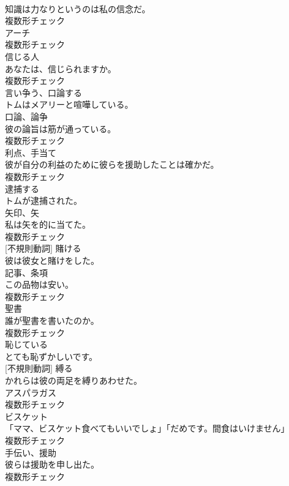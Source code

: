 \documentclass[8pt]{extreport}
\begin{document}
\begin{CJK}{UTF8}{min}
\\	知識は力なりというのは私の信念だ。	
\\	複数形チェック
\\	[名詞]	アーチ	
\\	複数形チェック
\\	[名詞]	信じる人	
\\	あなたは、信じられますか。	
\\	複数形チェック
\\	[動詞]	言い争う、口論する	
\\	トムはメアリーと喧嘩している。	
\\	[名詞]	口論、論争	
\\	彼の論旨は筋が通っている。	
\\	複数形チェック
\\	[名詞]	利点、手当て	
\\	彼が自分の利益のために彼らを援助したことは確かだ。	
\\	複数形チェック
\\	[動詞]	逮捕する	
\\	トムが逮捕された。	
\\	[名詞]	矢印、矢	
\\	私は矢を的に当てた。	
\\	複数形チェック
\\	[動詞] [不規則動詞]	賭ける	
\\	彼は彼女と賭けをした。	
\\	[名詞]	記事、条項	
\\	この品物は安い。	
\\	複数形チェック
\\	[名詞]	聖書	
\\	誰が聖書を書いたのか。	
\\	複数形チェック
\\	[形容詞]	恥じている	
\\	とても恥ずかしいです。	
\\	[動詞] [不規則動詞]	縛る	
\\	かれらは彼の両足を縛りあわせた。	
\\	[名詞]	アスパラガス	
\\	複数形チェック
\\	[名詞]	ビスケット	
\\	「ママ、ビスケット食べてもいいでしょ」「だめです。間食はいけません」	
\\	複数形チェック
\\	[名詞]	手伝い、援助	
\\	彼らは援助を申し出た。	
\\	複数形チェック

\end{CJK}
\end{document}
